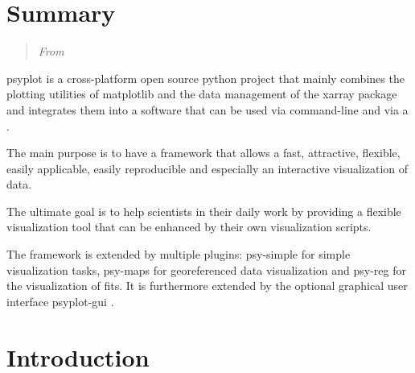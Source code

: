 

\label{chp:psyplot}

\begin{refsection}


\section{Summary}  \label{sec:psyplot-joss}

\blockquote{
	\textit{From}
}

\noindent psyplot \citep{Sommer2017} is a cross-platform open source python project that mainly combines the plotting utilities of matplotlib \citep{Hunter2007} and the data management of the xarray \citep{HoyerHamman2017} package and integrates them into a software that can be used via command-line and via a .

The main purpose is to have a framework that allows a fast, attractive, flexible, easily applicable, easily reproducible and especially an interactive visualization of data.
 
The ultimate goal is to help scientists in their daily work by providing a flexible visualization tool that can be enhanced by their own visualization scripts.

The framework is extended by multiple plugins: psy-simple \citep{Sommer2017b} for simple visualization tasks, psy-maps \citep{Sommer2017c} for georeferenced data visualization and psy-reg \citep{Sommer2017d} for the visualization of fits. It is furthermore extended by the optional graphical user interface psyplot-gui \citep{Sommer2017e}.


\section{Introduction}  \label{sec:psyplot-review}


\end{refsection}
